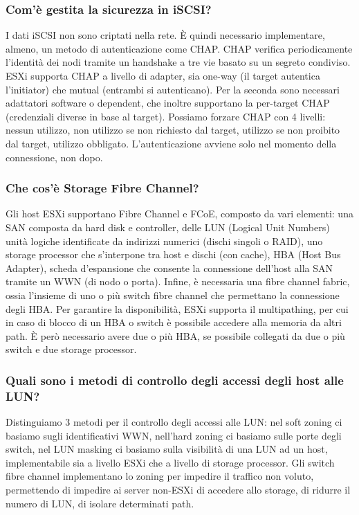 \documentclass[11pt]{article}
\begin{document}
\subsubsection{Com'è gestita la sicurezza in iSCSI?}
I dati iSCSI non sono criptati nella rete. È quindi necessario implementare, almeno, un metodo di autenticazione come CHAP. CHAP verifica periodicamente l'identità dei nodi tramite un handshake a tre vie basato su un segreto condiviso. ESXi supporta CHAP a livello di adapter, sia one-way (il target autentica l'initiator) che mutual (entrambi si autenticano). Per la seconda sono necessari adattatori software o dependent, che inoltre supportano la per-target CHAP (credenziali diverse in base al target). Possiamo forzare CHAP con 4 livelli: nessun utilizzo, non utilizzo se non richiesto dal target, utilizzo se non proibito dal target, utilizzo obbligato. L'autenticazione avviene solo nel momento della connessione, non dopo. 

\subsubsection{Che cos'è Storage Fibre Channel?}
Gli host ESXi supportano Fibre Channel e FCoE, composto da vari elementi: una SAN composta da hard disk e controller, delle LUN (Logical Unit Numbers) unità logiche identificate da indirizzi numerici (dischi singoli o RAID), uno storage processor che s'interpone tra host e dischi (con cache), HBA (Host Bus Adapter), scheda d'espansione che consente la connessione dell'host alla SAN tramite un WWN (di nodo o porta). Infine, è necessaria una fibre channel fabric, ossia l'insieme di uno o più switch fibre channel che permettano la connessione degli HBA. Per garantire la disponibilità, ESXi supporta il multipathing, per cui in caso di blocco di un HBA o switch è possibile accedere alla memoria da altri path. È però necessario avere due o più HBA, se possibile collegati da due o più switch e due storage processor. 

\subsubsection{Quali sono i metodi di controllo degli accessi degli host alle LUN?}
Distinguiamo 3 metodi per il controllo degli accessi alle LUN: nel soft zoning ci basiamo sugli identificativi WWN, nell'hard zoning ci basiamo sulle porte degli switch, nel LUN masking ci basiamo sulla visibilità di una LUN ad un host, implementabile sia a livello ESXi che a livello di storage processor. Gli switch fibre channel implementano lo zoning per impedire il traffico non voluto, permettendo di impedire ai server non-ESXi di accedere allo storage, di ridurre il numero di LUN, di isolare determinati path. 
\end{document}
